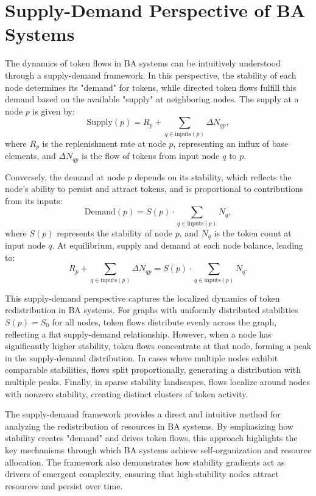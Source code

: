 \documentclass[entropy,article,submit,pdftex,moreauthors]{Definitions/mdpi}
\begin{document}
\section{Supply-Demand Perspective of BA Systems}

The dynamics of token flows in BA systems can be intuitively understood through a supply-demand framework. In this perspective, the stability of each node determines its "demand" for tokens, while directed token flows fulfill this demand based on the available "supply" at neighboring nodes. The supply at a node \( p \) is given by:
\begin{equation}
\text{Supply}(p) = R_p + \sum_{q \in \text{inputs}(p)} \Delta N_{qp},
\end{equation}
where \( R_p \) is the replenishment rate at node \( p \), representing an influx of base elements, and \( \Delta N_{qp} \) is the flow of tokens from input node \( q \) to \( p \). 

Conversely, the demand at node \( p \) depends on its stability, which reflects the node’s ability to persist and attract tokens, and is proportional to contributions from its inputs:
\begin{equation}
\text{Demand}(p) = S(p) \cdot \sum_{q \in \text{inputs}(p)} N_q,
\end{equation}
where \( S(p) \) represents the stability of node \( p \), and \( N_q \) is the token count at input node \( q \). At equilibrium, supply and demand at each node balance, leading to:
\begin{equation}
R_p + \sum_{q \in \text{inputs}(p)} \Delta N_{qp} = S(p) \cdot \sum_{q \in \text{inputs}(p)} N_q.
\end{equation}

This supply-demand perspective captures the localized dynamics of token redistribution in BA systems. For graphs with uniformly distributed stabilities \( S(p) = S_0 \) for all nodes, token flows distribute evenly across the graph, reflecting a flat supply-demand relationship. However, when a node has significantly higher stability, token flows concentrate at that node, forming a peak in the supply-demand distribution. In cases where multiple nodes exhibit comparable stabilities, flows split proportionally, generating a distribution with multiple peaks. Finally, in sparse stability landscapes, flows localize around nodes with nonzero stability, creating distinct clusters of token activity.

The supply-demand framework provides a direct and intuitive method for analyzing the redistribution of resources in BA systems. By emphasizing how stability creates "demand" and drives token flows, this approach highlights the key mechanisms through which BA systems achieve self-organization and resource allocation. The framework also demonstrates how stability gradients act as drivers of emergent complexity, ensuring that high-stability nodes attract resources and persist over time.
\end{document}
